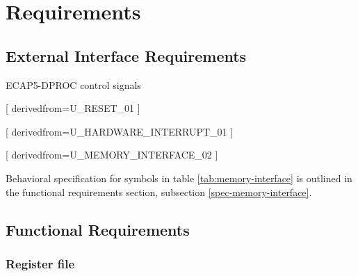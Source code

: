 \section{Requirements}

  \subsection{External Interface Requirements}

    \begin{table}[H]
        \centering
        
        \caption{ECAP5-DPROC control signals}
        \label{tab:control-interface}
      \end{table}


    [
        derivedfrom=U\_RESET\_01
      ]

    [
        derivedfrom=U\_HARDWARE\_INTERRUPT\_01
      ]


    

    [
        derivedfrom=U\_MEMORY\_INTERFACE\_02
      ]

    \begin{content}
        Behavioral specification for symbols in table \ref{tab:memory-interface} is outlined in the functional requirements section, subsection \ref{spec-memory-interface}.
      \end{content}
  
  \subsection{Functional Requirements}

    \subsubsection{Register file}

